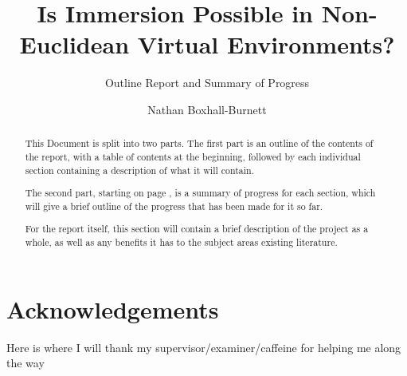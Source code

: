 \documentclass[abstract=on,12pt]{scrreprt}
\title{Is Immersion Possible in Non-Euclidean Virtual Environments?}
\subtitle{Outline Report and Summary of Progress}
\author{Nathan Boxhall-Burnett}
\begin{document}
	\maketitle

	\renewcommand\thepage{}

	\begin{abstract}
		This Document is split into two parts.
		The first part is an outline of the contents of the report, with a table of contents at the beginning, followed by each individual section containing a description of what it will contain.

		The second part, starting on page \pageref{summary}, is a summary of progress for each section, which will give a brief outline of the progress that has been made for it so far.

		For the report itself, this section will contain a brief description of the project as a whole, as well as any benefits it has to the subject areas existing literature.

	\end{abstract}

	\section*{Acknowledgements}
		Here is where I will thank my supervisor/examiner/caffeine for helping me along the way

	\tableofcontents

	\newpage
	\renewcommand\thepage{\arabic{page}}
\end{document}
